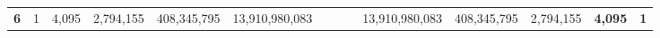 \documentclass[11pt,dvipsnames]{article} %
\newcommand{\1}{\mathds{1}}
\begin{document}
\begin{table}[h!]
\begin{tabular}{llllccccccclll}
{\color[HTML]{FF0000} \textbf{6}} & \multicolumn{1}{c}{1} & \multicolumn{1}{c}{4,095} & \multicolumn{1}{c}{2,794,155}  & 408,345,795          & 13,910,980,083                     & \multicolumn{1}{l}{}                 & \multicolumn{1}{l}{}                   & \multicolumn{1}{l}{}                    & \cellcolor[HTML]{FCE5CD}13,910,980,083  & \cellcolor[HTML]{CFE2F3}408,345,795 & \multicolumn{1}{c}{\cellcolor[HTML]{FCE5CD}2,794,155} & \multicolumn{1}{c}{\textbf{4,095}} & \multicolumn{1}{c}{\textbf{1}}
\end{tabular}
\end{table}



\end{document}
